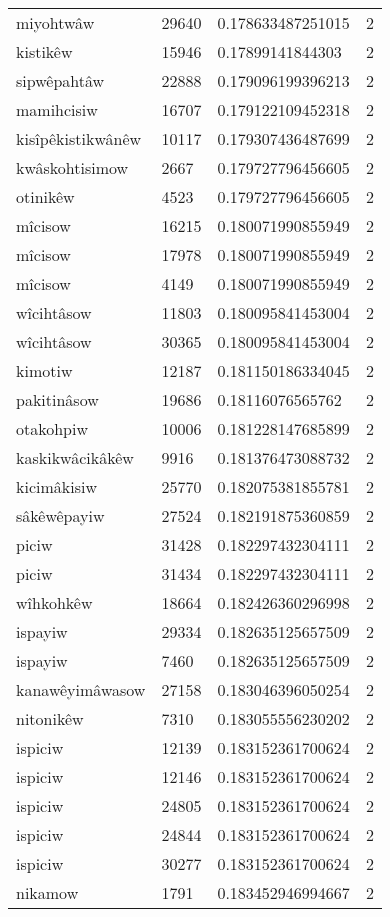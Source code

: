 \begin{longtable}{llll}
miyohtwâw & 29640 & 0.178633487251015 & 2 \\
kistikêw & 15946 & 0.17899141844303 & 2 \\
sipwêpahtâw & 22888 & 0.179096199396213 & 2 \\
mamihcisiw & 16707 & 0.179122109452318 & 2 \\
kisîpêkistikwânêw & 10117 & 0.179307436487699 & 2 \\
kwâskohtisimow & 2667 & 0.179727796456605 & 2 \\
otinikêw & 4523 & 0.179727796456605 & 2 \\
mîcisow & 16215 & 0.180071990855949 & 2 \\
mîcisow & 17978 & 0.180071990855949 & 2 \\
mîcisow & 4149 & 0.180071990855949 & 2 \\
wîcihtâsow & 11803 & 0.180095841453004 & 2 \\
wîcihtâsow & 30365 & 0.180095841453004 & 2 \\
kimotiw & 12187 & 0.181150186334045 & 2 \\
pakitinâsow & 19686 & 0.18116076565762 & 2 \\
otakohpiw & 10006 & 0.181228147685899 & 2 \\
kaskikwâcikâkêw & 9916 & 0.181376473088732 & 2 \\
kicimâkisiw & 25770 & 0.182075381855781 & 2 \\
sâkêwêpayiw & 27524 & 0.182191875360859 & 2 \\
piciw & 31428 & 0.182297432304111 & 2 \\
piciw & 31434 & 0.182297432304111 & 2 \\
wîhkohkêw & 18664 & 0.182426360296998 & 2 \\
ispayiw & 29334 & 0.182635125657509 & 2 \\
ispayiw & 7460 & 0.182635125657509 & 2 \\
kanawêyimâwasow & 27158 & 0.183046396050254 & 2 \\
nitonikêw & 7310 & 0.183055556230202 & 2 \\
ispiciw & 12139 & 0.183152361700624 & 2 \\
ispiciw & 12146 & 0.183152361700624 & 2 \\
ispiciw & 24805 & 0.183152361700624 & 2 \\
ispiciw & 24844 & 0.183152361700624 & 2 \\
ispiciw & 30277 & 0.183152361700624 & 2 \\
nikamow & 1791 & 0.183452946994667 & 2 \\

\end{longtable}
